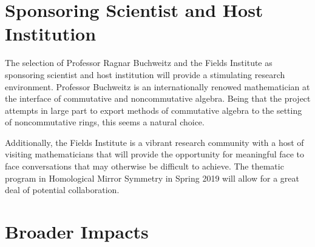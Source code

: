 \documentclass[11pt]{article}
\begin{document}
\section{Sponsoring Scientist and Host Institution}
The selection of Professor Ragnar Buchweitz and the Fields Institute as sponsoring scientist and host institution will provide a stimulating research environment.
Professor Buchweitz is an internationally renowed mathematician at the interface of commutative and noncommutative algebra.
Being that the project attempts in large part to export methods of commutative algebra to the setting of noncommutative rings, this seems a natural choice.

Additionally, the Fields Institute is a vibrant research community with a host of visiting mathematicians that will provide the opportunity for meaningful face to face conversations that may otherwise be difficult to achieve.
The thematic program in Homological Mirror Symmetry in Spring 2019 will allow for a great deal of potential collaboration.
\section{Broader Impacts}

\newpage
\setcounter{page}{1}

\end{document}
